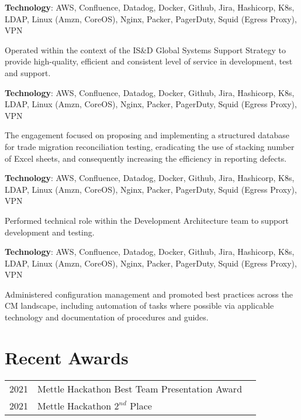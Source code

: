 \begin{minipage}[t]{1.0\textwidth}
\sectionsep
\textbf{Technology}: AWS, Confluence, Datadog, Docker, Github, Jira, Hashicorp, K8s, LDAP, Linux (Amzn, CoreOS), Nginx, Packer, PagerDuty, Squid (Egress Proxy), VPN
\sectionsep
\begin{tightemize}
\item Operated within the context of the IS\&D Global Systems Support Strategy to provide high-quality, efficient and consistent level of service in development, test and support.
\end{tightemize}
\sectionsep
\sectionsep
{}
\sectionsep
\textbf{Technology}: AWS, Confluence, Datadog, Docker, Github, Jira, Hashicorp, K8s, LDAP, Linux (Amzn, CoreOS), Nginx, Packer, PagerDuty, Squid (Egress Proxy), VPN
\sectionsep
\begin{tightemize}
\item The engagement focused on proposing and implementing a structured database for trade migration reconciliation testing, eradicating the use of stacking number of Excel sheets, and consequently increasing the efficiency in reporting defects.
\end{tightemize}
\sectionsep
\sectionsep
{}
\sectionsep
\textbf{Technology}: AWS, Confluence, Datadog, Docker, Github, Jira, Hashicorp, K8s, LDAP, Linux (Amzn, CoreOS), Nginx, Packer, PagerDuty, Squid (Egress Proxy), VPN
\sectionsep
\begin{tightemize}
\item Performed technical role within the Development Architecture team to support development and testing.
\end{tightemize}
\sectionsep
\sectionsep
{}
\sectionsep
\textbf{Technology}: AWS, Confluence, Datadog, Docker, Github, Jira, Hashicorp, K8s, LDAP, Linux (Amzn, CoreOS), Nginx, Packer, PagerDuty, Squid (Egress Proxy), VPN
\sectionsep
\begin{tightemize}
\item Administered configuration management and promoted best practices across the CM landscape, including automation of tasks where possible via applicable technology and documentation of procedures and guides.
\end{tightemize}

\section{Recent Awards}\label{sec:awards}
\begin{tabular}{rll}
2021 & Mettle Hackathon Best Team Presentation Award \\
2021 & Mettle Hackathon $2^{nd}$ Place
\end{tabular}
\end{minipage}